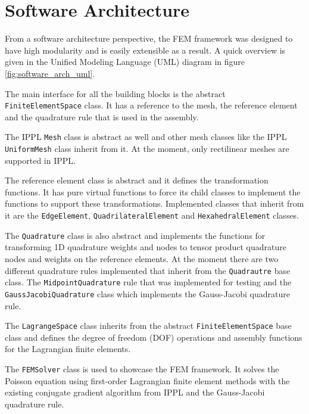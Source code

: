 \section{Software Architecture}
\label{sec:software_architecture}

From a software architecture perspective, the FEM framework was designed to have high modularity
and is easily extensible as a result.
A quick overview is given in the Unified Modeling Language (UML) diagram in figure \ref{fig:software_arch_uml}.

The main interface for all the building blocks is the abstract \texttt{FiniteElementSpace} class.
It has a reference to the mesh, the reference element and the quadrature rule that is used in the assembly.

The IPPL \texttt{Mesh} class is abstract as well and other mesh classes like the IPPL \texttt{UniformMesh} class inherit from it.
At the moment, only rectilinear meshes are supported in IPPL.

The reference element class is abstract and it defines the transformation functions. It has pure virtual
functions to force its child classes to implement the functions to support these transformations.
Implemented classes that inherit from it are the \texttt{EdgeElement}, \texttt{QuadrilateralElement} and \texttt{HexahedralElement} classes.

The \texttt{Quadrature} class is also abstract and implements the functions for transforming 1D quadrature
weights and nodes to tensor product quadrature nodes and weights on the reference elements.
At the moment there are two different quadrature rules implemented that inherit from the
\texttt{Quadrautre} base class. The \texttt{MidpointQuadrature} rule that was implemented for testing and
the \texttt{GaussJacobiQuadrature} class which implements the Gauss-Jacobi quadrature rule.

The \texttt{LagrangeSpace} class inherits from the abstract \texttt{FiniteElementSpace} base class
and defines the degree of freedom (DOF) operations and assembly functions for the Lagrangian finite elements.

The \texttt{FEMSolver} class is used to showcase the FEM framework.
It solves the Poisson equation using first-order Lagrangian finite element methods
with the existing conjugate gradient algorithm from IPPL and the Gauss-Jacobi quadrature rule.

